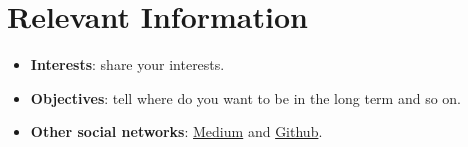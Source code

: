 \section{\faCheckCircle \hspace{0.1cm} Relevant Information}

\vspace{5pt}
\begin{itemize}
    \itemsep0em
    \item \textbf{Interests}: share your interests.
    \item \textbf{Objectives}: tell where do you want to be in the long term and so on.

    \item \textbf{Other social networks}: \href{https://medium.com/@lgperrin}{Medium} and \href{https://github.com/lgperrin}{Github}.

\end{itemize}
